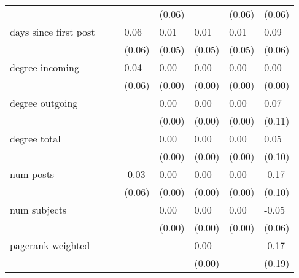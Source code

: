 \begin{table}
\begin{center}
\begin{tabular}{llllllll}
                                                 &          &            &         & (0.06)  &              & (0.06)             & (0.06)    \\
 days since first post                      &          &            & 0.06    & 0.01    & 0.01         & 0.01               & 0.09      \\
                                                 &          &            & (0.06)  & (0.05)  & (0.05)       & (0.05)             & (0.06)    \\
 degree incoming                            &          &            & 0.04    & 0.00    & 0.00         & 0.00               & 0.00      \\
                                                 &          &            & (0.06)  & (0.00)  & (0.00)       & (0.00)             & (0.00)    \\
 degree outgoing                            &          &            &         & 0.00    & 0.00         & 0.00               & 0.07      \\
                                                 &          &            &         & (0.00)  & (0.00)       & (0.00)             & (0.11)    \\
 degree total                               &          &            &         & 0.00    & 0.00         & 0.00               & 0.05      \\
                                                 &          &            &         & (0.00)  & (0.00)       & (0.00)             & (0.10)    \\
 num posts                                  &          &            & -0.03   & 0.00    & 0.00         & 0.00               & -0.17     \\
                                                 &          &            & (0.06)  & (0.00)  & (0.00)       & (0.00)             & (0.10)    \\
 num subjects                               &          &            &         & 0.00    & 0.00         & 0.00               & -0.05     \\
                                                 &          &            &         & (0.00)  & (0.00)       & (0.00)             & (0.06)    \\
 pagerank weighted                          &          &            &         &         & 0.00         &                    & -0.17     \\
                                                 &          &            &         &         & (0.00)       &                    & (0.19)    \\

\end{tabular}
\end{center}
\end{table}
